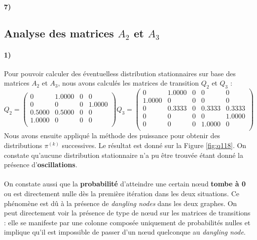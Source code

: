 \documentclass[a4paper,titlepage]{report}
\begin{document}
\paragraph{7)} 
\subsection{Analyse des matrices $A_2$ et $A_3$}
\paragraph{1)} Pour pouvoir calculer des éventuelless distribution stationnaires sur base des matrices $A_2$ et $A_3$, nous avons calculés les matrices de transition $Q_2$ et $Q_3$ : 
\[
Q_2 = 
\begin{pmatrix}
         0 &   1.0000  &       0  &       0 \\
         0 &        0  &       0  &  1.0000 \\
    0.5000 &   0.5000  &       0  &       0 \\
    1.0000 &        0  &       0  &       0 \\
\end{pmatrix}
Q_3 = 
\begin{pmatrix}
        0  &   1.0000   &      0  &       0  &       0 \\
    1.0000 &        0   &      0  &       0  &       0 \\
         0 &   0.3333   &      0  &  0.3333  &  0.3333 \\
         0 &        0   &      0  &       0  &  1.0000 \\
         0 &        0   &      0  &  1.0000  &       0 \\
\end{pmatrix}
\]
Nous avons ensuite appliqué la méthode des puissance pour obtenir des distributions $\pi^{(k)}$ successives. Le résultat est donné sur la Figure \ref{fig:q118}. On constate qu'aucune distribution stationnaire n'a pu être trouvée étant donné la présence d'\textbf{oscillations}.
\paragraph{}
On constate aussi que la \textbf{probabilité} d'atteindre une certain nœud \textbf{tombe à 0} ou est directement nulle dès la première itération dans les deux situations. Ce phénomène est dû à la présence de \textit{dangling nodes} dans les deux graphes. On peut directement voir la présence de type de nœud sur les matrices de transitions :  elle se manifeste par une colonne composée uniquement de probabilités nulles et implique qu'il est impossible de passer d'un nœud quelconque au \textit{dangling node}.
\end{document}

